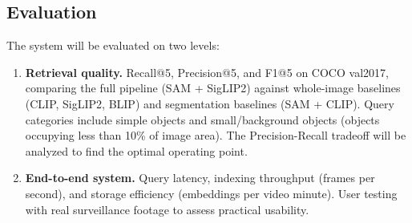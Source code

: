 \subsection{Evaluation}

The system will be evaluated on two levels:

\begin{enumerate}
    \item \textbf{Retrieval quality.} Recall@5, Precision@5, and F1@5 on COCO val2017, comparing the full pipeline (SAM + SigLIP2) against whole-image baselines (CLIP, SigLIP2, BLIP) and segmentation baselines (SAM + CLIP). Query categories include simple objects and small/background objects (objects occupying less than 10\% of image area). The Precision-Recall tradeoff will be analyzed to find the optimal operating point.
    \item \textbf{End-to-end system.} Query latency, indexing throughput (frames per second), and storage efficiency (embeddings per video minute). User testing with real surveillance footage to assess practical usability.
\end{enumerate}

